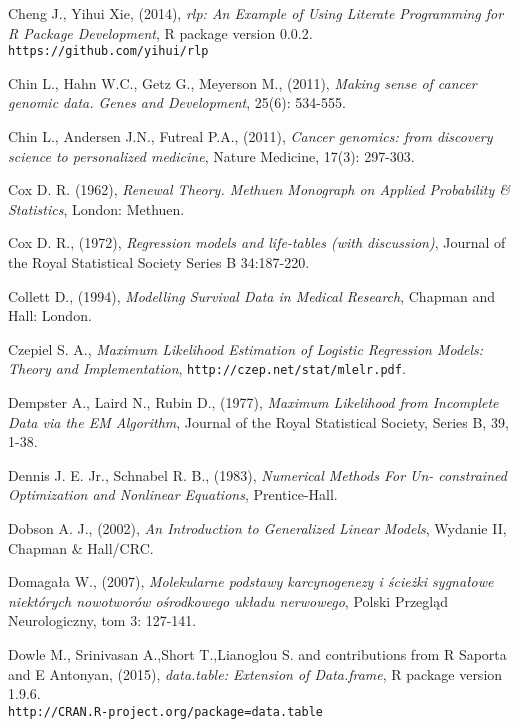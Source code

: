 \begin{thebibliography}{99}
 Cheng J., Yihui Xie, (2014), \textit{rlp: An Example of Using Literate Programming for R Package Development}, R package version 0.0.2. \\ \texttt{https://github.com/yihui/rlp}

 Chin L., Hahn W.C., Getz G., Meyerson M., (2011), \textit{Making sense of cancer genomic data. Genes and Development}, 25(6): 534-555.

 Chin L., Andersen J.N., Futreal P.A., (2011), \textit{Cancer genomics: from discovery science to personalized medicine}, Nature Medicine, 17(3): 297-303.

 Cox D. R. (1962), \textit{Renewal Theory. Methuen Monograph on Applied Probability
\& Statistics}, London: Methuen.

  Cox D. R., (1972), \textit{Regression models and life-tables (with discussion)}, Journal of the Royal Statistical Society Series B 34:187-220.


 Collett D., (1994), \textit{Modelling Survival Data in Medical Research}, Chapman and Hall:
London.

 Czepiel S. A., \textit{Maximum Likelihood Estimation of Logistic Regression Models: Theory and Implementation}, \texttt{http://czep.net/stat/mlelr.pdf}.

 Dempster A., Laird N., Rubin D., (1977), \textit{Maximum Likelihood from Incomplete Data via the
EM Algorithm}, Journal of the Royal Statistical Society, Series B, 39, 1-38.


 Dennis J. E. Jr., Schnabel R. B., (1983), \textit{Numerical Methods For Un-
constrained Optimization and Nonlinear Equations}, Prentice-Hall.

 Dobson A. J., (2002), \textit{An Introduction to Generalized Linear Models}, Wydanie II, Chapman \& Hall/CRC.

 Domagała W., (2007), \textit{Molekularne podstawy karcynogenezy i ścieżki sygnałowe niektórych nowotworów ośrodkowego układu nerwowego}, Polski Przegląd Neurologiczny, tom 3: 127-141.

 Dowle M., Srinivasan A.,Short T.,Lianoglou S. and contributions from R
  Saporta and E Antonyan, (2015), \textit{data.table: Extension of Data.frame}, R package version 1.9.6. \\
   \texttt{http://CRAN.R-project.org/package=data.table}



\end{thebibliography}
